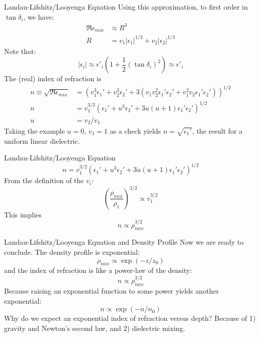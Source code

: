 \documentclass{beamer}
\begin{document}
\begin{frame}{Landau-Lifshitz/Looyenga Equation}
Using this approximation, to first order in $\tan\delta_i$, we have:
\begin{align}
\Re{\epsilon_{mix}} &\approx R^3 \\
R &= v_1 |\epsilon_1|^{1/3} + v_2 |\epsilon_2|^{1/3}
\end{align}
Note that:
\begin{equation}
|\epsilon_i| \approx \epsilon'_i\left(1+\frac{1}{2}(\tan\delta_i)^2\right) \approx \epsilon'_i
\end{equation}
The (real) index of refraction is
\begin{align}
n \equiv \sqrt{\Re{\epsilon_{mix}}} &= \left( v_1^3 \epsilon_1' + v_2^3 \epsilon_2' + 3(v_1 v_2^2\epsilon_1'\epsilon_2' + v_1^2v_2\epsilon_1'\epsilon_2') \right)^{1/2} \\
n &= v_1^{3/2}\left(\epsilon_1' + u^3 \epsilon_2' + 3u(u + 1)\epsilon_1'\epsilon_2' \right)^{1/2} \\
u &= v_2/v_1
\end{align}
Taking the example $u=0$, $v_1 = 1$ as a check yields $n = \sqrt{\epsilon_1'}$, the result for a uniform linear dielectric.
\end{frame}

\begin{frame}{Landau-Lifshitz/Looyenga Equation}
\begin{equation}
n = v_1^{3/2}\left(\epsilon_1' + u^3 \epsilon_2' + 3u(u + 1)\epsilon_1'\epsilon_2' \right)^{1/2}
\end{equation}
From the definition of the $v_i$:
\begin{equation}
\left(\frac{\rho_{mix}}{\rho_1}\right)^{3/2} \propto v_1^{3/2}
\end{equation}
This implies
\begin{equation}
n \propto \rho_{mix}^{3/2}
\end{equation}
\end{frame}

\begin{frame}{Landau-Lifshitz/Looyenga Equation and Density Profile}
Now we are ready to conclude.  The density profile is exponential:
\begin{equation}
\rho_{mix} \propto \exp(-z/z_0)
\end{equation}
and the index of refraction is like a power-law of the density:
\begin{equation}
n \propto \rho_{mix}^{3/2}
\end{equation}
Because raising an exponential function to some power yields another exponential:
\begin{equation}
\boxed{n \propto \exp(-n/n_0)}
\end{equation}
Why do we expect an exponential index of refraction versus depth? Because of 1) gravity and Newton's second law, and 2) dielectric mixing.
\end{frame}
\end{document}
